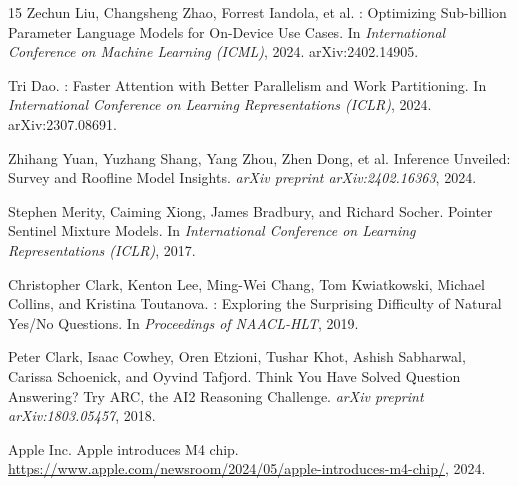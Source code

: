 \documentclass{article}
\begin{document}
\begin{thebibliography}{15}
Zechun Liu, Changsheng Zhao, Forrest Iandola, et al.
: Optimizing Sub-billion Parameter Language Models for On-Device Use Cases.
\newblock In \emph{International Conference on Machine Learning (ICML)}, 2024.
\newblock arXiv:2402.14905.

Tri Dao.
: Faster Attention with Better Parallelism and Work Partitioning.
\newblock In \emph{International Conference on Learning Representations (ICLR)}, 2024.
\newblock arXiv:2307.08691.

Zhihang Yuan, Yuzhang Shang, Yang Zhou, Zhen Dong, et al.
 Inference Unveiled: Survey and Roofline Model Insights.
\newblock \emph{arXiv preprint arXiv:2402.16363}, 2024.

Stephen Merity, Caiming Xiong, James Bradbury, and Richard Socher.
\newblock Pointer Sentinel Mixture Models.
\newblock In \emph{International Conference on Learning Representations (ICLR)}, 2017.

Christopher Clark, Kenton Lee, Ming-Wei Chang, Tom Kwiatkowski, Michael Collins, and Kristina Toutanova.
: Exploring the Surprising Difficulty of Natural Yes/No Questions.
\newblock In \emph{Proceedings of NAACL-HLT}, 2019.

Peter Clark, Isaac Cowhey, Oren Etzioni, Tushar Khot, Ashish Sabharwal, Carissa Schoenick, and Oyvind Tafjord.
\newblock Think You Have Solved Question Answering? {Try ARC}, the AI2 Reasoning Challenge.
\newblock \emph{arXiv preprint arXiv:1803.05457}, 2018.

Apple Inc.
\newblock Apple introduces M4 chip.
\newblock \url{https://www.apple.com/newsroom/2024/05/apple-introduces-m4-chip/}, 2024.

\end{thebibliography}
\end{document}
